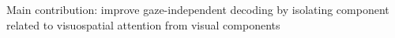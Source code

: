 Main contribution: improve gaze-independent decoding by isolating component
related to visuospatial attention from visual components
